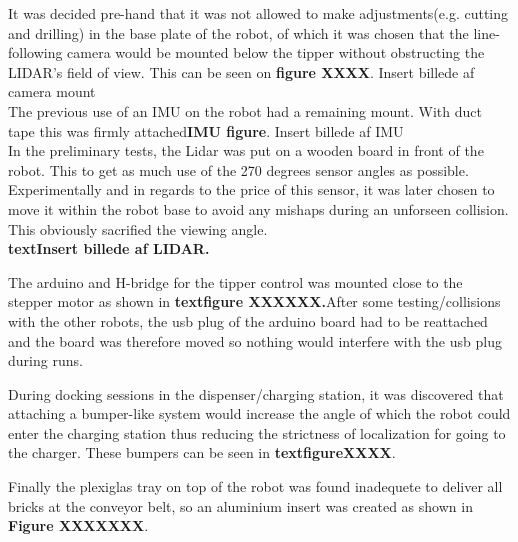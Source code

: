 It was decided pre-hand that it was not allowed to make adjustments(e.g. 
cutting and drilling) in the base plate of the robot, of which it was chosen 
that the line-following camera would be mounted below the tipper without 
obstructing the LIDAR's field of view. This can be seen on \textbf{figure XXXX}.
Insert billede af camera mount\\
The previous use of an IMU on the robot had a remaining mount. With duct tape 
this was firmly attached\textbf{IMU figure}.
Insert billede af IMU\\

In the preliminary tests, the Lidar was put on a wooden board in front of the 
robot. This to get as much use of the 270 degrees sensor angles as possible. 
Experimentally and in regards to the price of this sensor, it was later chosen 
to move it within the robot base to avoid any mishaps during an unforseen 
collision. This obviously sacrified the viewing angle. \\
\textbf{textInsert billede af LIDAR.}

The arduino and H-bridge for the tipper control was mounted close to the 
stepper motor as shown in \textbf{textfigure XXXXXX.}After some 
testing/collisions with the other robots, the usb plug of the arduino board had 
to be reattached and the board was therefore moved so nothing would interfere 
with the usb plug during runs. 

During docking sessions in the dispenser/charging station, it was discovered 
that attaching a bumper-like system would increase the angle of which the robot 
could enter the charging station thus reducing the strictness of localization 
for going to the charger. These bumpers can be seen in 
\textbf{textfigureXXXX}.  

Finally the plexiglas tray on top of the robot was found inadequete to deliver 
all bricks at the conveyor belt, so an aluminium insert was created as shown in 
\textbf{Figure XXXXXXX}.

